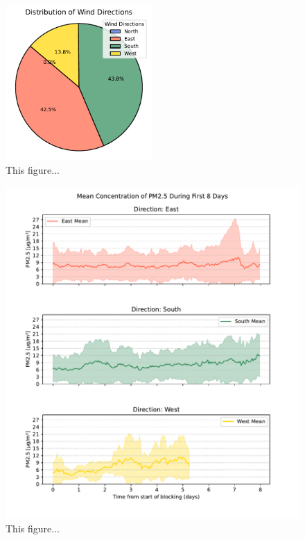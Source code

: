 \begin{figure}[H]
    \centering    \includegraphics[width=0.5\textwidth]{Figures/PieChart.pdf}
    \caption{This figure...}
    \label{fig:PieChart}
\end{figure}

\begin{figure}[H]
    \centering    \includegraphics[width=1\textwidth]{Figures/Meanplot_dir.pdf}
    \caption{This figure...}
    \label{fig:Meanplot_dir}
\end{figure}


